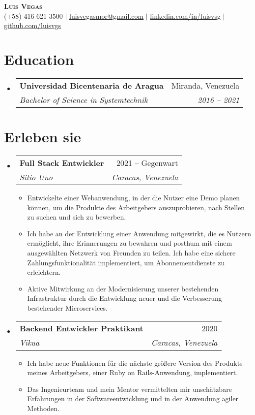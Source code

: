\documentclass[letterpaper,11pt]{article}
\makeatletter
\newcommand{\resumeItem}[1]{
  \item\small{
    {#1 \vspace{-2pt}}
  }
}
\newcommand{\resumeSubheading}[4]{
  \vspace{-2pt}\item
    \begin{tabular*}{0.97\textwidth}[t]{l@{\extracolsep{\fill}}r}
      \textbf{#1} & #2 \\
      \textit{\small#3} & \textit{\small #4} \\
    \end{tabular*}\vspace{-7pt}
}
\newcommand{\resumeSubHeadingListStart}{\begin{itemize}[leftmargin=0.15in, label={}]}
\newcommand{\resumeSubHeadingListEnd}{\end{itemize}}
\newcommand{\resumeItemListStart}{\begin{itemize}}
\newcommand{\resumeItemListEnd}{\end{itemize}\vspace{-5pt}}
\makeatother
\begin{document}
\begin{center}
    \textbf{\Huge \scshape Luis Vegas} \\ \vspace{1pt}
    \small (+58) 416-621-3500 $|$ \href{mailto:x@x.com}{\underline{luisvegasmor@gmail.com}} $|$
    \href{https://linkedin.com/in/luisvsg}{\underline{linkedin.com/in/luisvsg}} $|$
    \href{https://github.com/luisvgs}{\underline{github.com/luisvgs}}
\end{center}


\section{Education}
  \resumeSubHeadingListStart
    \resumeSubheading
      {Universidad Bicentenaria de Aragua}{Miranda, Venezuela}
      {Bachelor of Science in Systemtechnik}{2016 -- 2021}
  \resumeSubHeadingListEnd

\section{Erleben sie}
  \resumeSubHeadingListStart

\resumeSubheading
  {Full Stack Entwickler}{2021 -- Gegenwart}
  {Sitio Uno}{Caracas, Venezuela}
  \resumeItemListStart
    \resumeItem{Entwickelte einer Webanwendung, in der die Nutzer eine Demo planen können, um die Produkte des Arbeitgebers auszuprobieren, nach Stellen zu suchen und sich zu bewerben.}
    \resumeItem{Ich habe an der Entwicklung einer Anwendung mitgewirkt, die es Nutzern ermöglicht, ihre Erinnerungen zu bewahren und posthum mit einem ausgewählten Netzwerk von Freunden zu teilen. Ich habe eine sichere Zahlungsfunktionalität implementiert, um Abonnementdienste zu erleichtern.}
    \resumeItem{Aktive Mitwirkung an der Modernisierung unserer bestehenden Infrastruktur durch die Entwicklung neuer und die Verbesserung bestehender Microservices.}
  \resumeItemListEnd

\resumeSubheading
  {Backend Entwickler Praktikant}{2020}
  {Vikua}{Caracas, Venezuela}
  \resumeItemListStart
    \resumeItem{Ich habe neue Funktionen für die nächste größere Version des Produkts meines Arbeitgebers, einer Ruby on Rails-Anwendung, implementiert.}
    \resumeItem{Das Ingenieurteam und mein Mentor vermittelten mir unschätzbare Erfahrungen in der Softwareentwicklung und in der Anwendung agiler Methoden.}
  \resumeItemListEnd

\resumeSubHeadingListEnd
\end{document}
